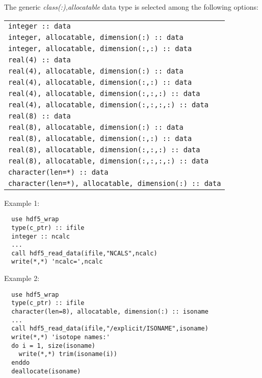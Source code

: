 \vskip 0.5cm

\noindent The generic {\it class(:),allocatable} data type is selected among the following options:

\vskip 0.2cm
\begin{tabular}{|p{10.5cm}|}
\hline
{\tt integer  :: data} \\
{\tt integer, allocatable, dimension(:) :: data} \\
{\tt integer, allocatable, dimension(:,:) :: data} \\
{\tt real(4) :: data} \\
{\tt real(4), allocatable, dimension(:) :: data} \\
{\tt real(4), allocatable, dimension(:,:) :: data} \\
{\tt real(4), allocatable, dimension(:,:,:) :: data} \\
{\tt real(4), allocatable, dimension(:,:,:,:) :: data} \\
{\tt real(8) :: data} \\
{\tt real(8), allocatable, dimension(:) :: data} \\
{\tt real(8), allocatable, dimension(:,:) :: data} \\
{\tt real(8), allocatable, dimension(:,:,:) :: data} \\
{\tt real(8), allocatable, dimension(:,:,:,:) :: data} \\
{\tt character(len=*) :: data} \\
{\tt character(len=*), allocatable, dimension(:) :: data} \\
\hline
\end{tabular}

\vskip 0.4cm
\goodbreak

\noindent Example 1:
\begin{verbatim}
  use hdf5_wrap
  type(c_ptr) :: ifile
  integer :: ncalc
  ...
  call hdf5_read_data(ifile,"NCALS",ncalc)
  write(*,*) 'ncalc=',ncalc
\end{verbatim}

\vskip 0.3cm

\noindent Example 2:
\begin{verbatim}
  use hdf5_wrap
  type(c_ptr) :: ifile
  character(len=8), allocatable, dimension(:) :: isoname
  ...
  call hdf5_read_data(ifile,"/explicit/ISONAME",isoname)
  write(*,*) 'isotope names:'
  do i = 1, size(isoname)
    write(*,*) trim(isoname(i))
  enddo
  deallocate(isoname)
\end{verbatim}

\vskip 0.3cm

